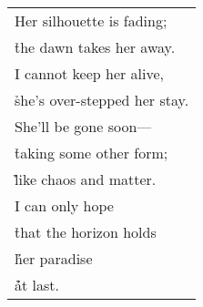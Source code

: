 \documentclass{article}
\begin{document}
\begin{center}
\begin{tabular}{l}
Her silhouette is fading; \\
\h the dawn takes her away. \\
I cannot keep her alive, \\
\h she's over-stepped her stay. \\
She'll be gone soon--- \\
\h taking some other form; \\
\h\h like chaos and matter. \\
I can only hope \\
\h that the horizon holds \\
\h\h her paradise \\
\h\h\h at last. \\
\end{tabular}
%
%
%
%
%

\end{center}
\end{document}

